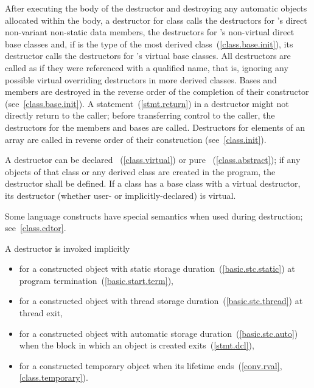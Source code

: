 \pnum
{}%
%
%
After executing the body of the destructor and destroying
any automatic objects allocated within the body, a
destructor for class
calls the destructors for
's
direct non-variant non-static data members, the destructors for
's
non-virtual direct base classes and, if
is the type of the most derived class~(\ref{class.base.init}),
its destructor calls the destructors for
's
virtual base classes.
All destructors are called as if they were referenced with a qualified name,
that is, ignoring any possible virtual overriding destructors in more
derived classes.
Bases and members are destroyed in the reverse order of the completion of
their constructor (see~\ref{class.base.init}).
A
statement~(\ref{stmt.return}) in a destructor might not directly return to the
caller; before transferring control to the caller, the destructors for the
members and bases are called.
%
Destructors for elements of an array are called in reverse order of their
construction (see~\ref{class.init}).

\pnum
{}%
%
A destructor can be declared
~(\ref{class.virtual})
or pure
~(\ref{class.abstract});
if any objects of that class or any derived class are created in the program,
the destructor shall be defined.
If a class has a base class with a virtual destructor, its  destructor
(whether user- or implicitly-declared) is virtual.

\pnum
\begin{note}
%
Some language constructs have special semantics when used during destruction;
see~\ref{class.cdtor}.
\end{note}

\pnum
{}%
%
A destructor is invoked implicitly

\begin{itemize}

\item for a constructed object with static storage duration~(\ref{basic.stc.static}) at program termination~(\ref{basic.start.term}),

\item for a constructed object with thread storage duration~(\ref{basic.stc.thread}) at thread exit,

\item for a constructed object with automatic storage duration~(\ref{basic.stc.auto}) when the block in which an object is created exits~(\ref{stmt.dcl}),

\item for a constructed temporary object when its lifetime ends~(\ref{conv.rval}, \ref{class.temporary}).
\end{itemize}

